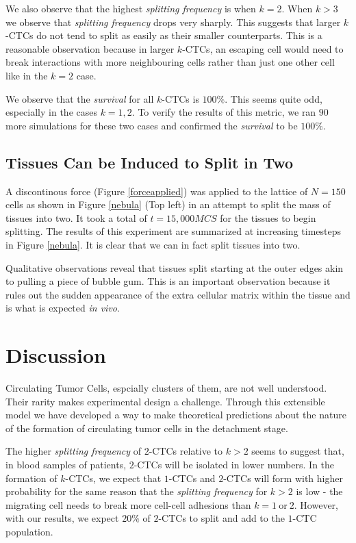 \documentclass[12pt]{article}
\begin{document}
We also observe that the highest \emph{splitting frequency} is when $k=2$. When $k>3$ we observe that \emph{splitting frequency} drops very sharply. This suggests that larger $k$-CTCs do not tend to split as easily as their smaller counterparts. This is a reasonable observation because in larger $k$-CTCs, an escaping cell would need to break interactions with more neighbouring cells rather than just one other cell like in the $k=2$ case.

We observe that the \emph{survival} for all $k$-CTCs is $100\%$. This seems quite odd, especially in the cases $k=1,2$. To verify the results of this metric, we ran $90$ more simulations for these two cases and confirmed the \emph{survival} to be $100\%$.

\subsection{Tissues Can be Induced to Split in Two}
A discontinous force (Figure \ref{forceapplied}) was applied to the lattice of $N=150$ cells as shown in Figure \ref{nebula} (Top left) in an attempt to split the mass of tissues into two. It took a total of $t=15,000MCS$ for the tissues to begin splitting. The results of this experiment are summarized at increasing timesteps in Figure \ref{nebula}. It is clear that we can in fact split tissues into two.

Qualitative observations reveal that tissues split starting at the outer edges akin to pulling a piece of bubble gum. This is an important observation because it rules out the sudden appearance of the extra cellular matrix within the tissue and is what is expected \emph{in vivo}.
\section{Discussion}
Circulating Tumor Cells, espcially clusters of them, are not well understood. Their rarity makes experimental design a challenge. Through this extensible model we have developed a way to make theoretical predictions about the nature of the formation of circulating tumor cells in the detachment stage. 

The higher \emph{splitting frequency} of $2$-CTCs relative to $k>2$ seems to suggest that, in blood samples of patients, $2$-CTCs will be isolated in lower numbers. In the formation of $k$-CTCs, we expect that $1$-CTCs and $2$-CTCs will form with higher probability for the same reason that the \emph{splitting frequency} for $k>2$ is low - the migrating cell needs to break more cell-cell adhesions than $k=1~\text{or}~2$. However, with our results, we expect $20\%$ of $2$-CTCs to split and add to the $1$-CTC population.
\end{document}
